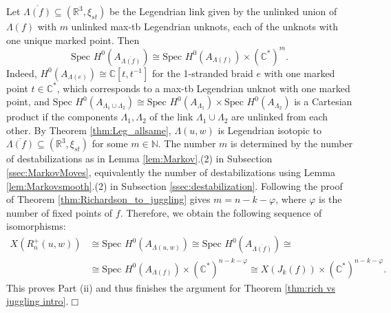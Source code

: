 \documentclass[10pt]{amsart}
\theoremstyle{plain}
\theoremstyle{definition}
\theoremstyle{remark}
\numberwithin{equation}{section}
\newcommand{\N}{\mathbb{N}}
\newcommand{\R}{\mathbb{R}}
\newcommand{\C}{\mathbb{C}}
\newcommand{\La}{\Lambda}
\newcommand{\sse}{\subseteq}
\renewcommand{\C}{\mathbb{C}}
\newcommand{\MG}[1]{{\color{teal}{{\bf Misha}: #1}}}
\begin{document}
\noindent Let $\overline{\La(f)}\sse(\R^3,\xi_{st})$ be the Legendrian link given by the unlinked union of $\La(f)$ with $m$ unlinked max-tb Legendrian unknots, each of the unknots with one unique marked point. Then
$$\mbox{Spec } H^0(A_{\overline{\La(f)}})\cong \mbox{Spec } H^0(A_{\La(f)})\times (\C^*)^{m}.$$
Indeed, $H^0(A_{\Lambda(e)})\cong \C[t,t^{-1}]$ for the 1-stranded braid $e$ with one marked point $t\in\C^*$, which corresponds to a max-tb Legendrian unknot with one marked point, and $\mbox{Spec } H^0(A_{\La_1\cup\La_2})\cong \mbox{Spec } H^0(A_{\La_1})\times \mbox{Spec } H^0(A_{\La_2})$ is a Cartesian product if the components $\La_1,\La_2$ of the link $\La_1\cup\La_2$  are unlinked from each other. %
By Theorem \ref{thm:Leg_allsame}, $\La(u,w)$ is Legendrian isotopic to $\overline{\La(f)}\sse(\R^3,\xi_{st})$ for some $m\in\N$. The number $m$ is determined by the number of destabilizations %
as in Lemma \ref{lem:Markov}.(2) in Subsection \ref{ssec:MarkovMoves}, equivalently the number of destabilizations using Lemma \ref{lem:Markovsmooth}.(2) in Subsection \ref{ssec:destabilization}. Following the proof of Theorem \ref{thm:Richardson_to_juggling} gives $m=n-k-\varphi$, where $\varphi$ is the number of fixed points of $f$. Therefore, we obtain  the following sequence of isomorphisms:
\begin{align*}
X(R_n^+(u,w))&\cong\mbox{Spec } H^0(A_{\La(u,w)})\cong\mbox{Spec } H^0(A_{\overline{\La(f)}})\cong\\
&\cong\mbox{Spec } H^0(A_{\La(f)})\times (\C^*)^{n-k-\varphi}
\cong X(J_{k}(f)) \times (\mathbb{C}^{*})^{n-k-\varphi}.
\end{align*}
This proves Part (ii) and thus finishes the argument for Theorem \ref{thm:rich vs juggling intro}.\hfill$\Box$
\end{document}
